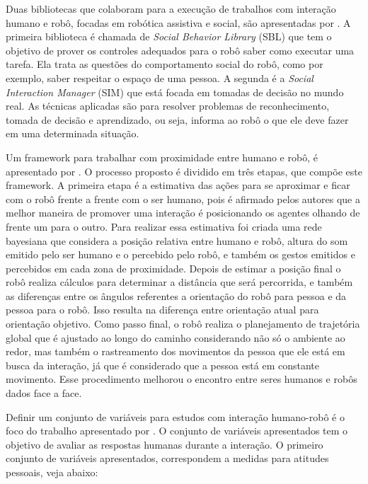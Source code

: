 Duas bibliotecas que colaboram para a execução de trabalhos com interação humano e robô, focadas em robótica assistiva e social, são apresentadas por . A primeira biblioteca é chamada de \emph{Social Behavior Library} (SBL) que tem o objetivo de prover os controles adequados para o robô saber como executar uma tarefa. Ela trata as questões do comportamento social do robô, como por exemplo, saber respeitar o espaço de uma pessoa. A segunda é a \emph{Social Interaction Manager} (SIM) que está focada em tomadas de decisão no mundo real. As técnicas aplicadas são para resolver problemas de reconhecimento, tomada de decisão e aprendizado, ou seja, informa ao robô o que ele deve fazer em uma determinada situação.

Um framework para trabalhar com proximidade entre humano e robô, é apresentado por . O processo proposto é dividido em três etapas, que compõe este framework. A primeira etapa é a estimativa das ações para se aproximar e ficar com o robô frente a frente com o ser humano, pois é afirmado pelos autores que a melhor maneira de promover uma interação é posicionando os agentes olhando de frente um para o outro. Para realizar essa estimativa foi criada uma rede bayesiana que considera a posição relativa entre humano e robô, altura do som emitido pelo ser humano e o percebido pelo robô, e também os gestos emitidos e percebidos em cada zona de proximidade. Depois de estimar a posição final o robô realiza cálculos para determinar a distância que será percorrida, e também as diferenças entre os ângulos referentes a orientação do robô para pessoa e da pessoa para o robô. Isso resulta na diferença entre orientação atual para orientação objetivo. Como passo final, o robô realiza o planejamento de trajetória global que é ajustado ao longo do caminho considerando não só o ambiente ao redor, mas também o rastreamento dos movimentos da pessoa que ele está em busca da interação, já que é considerado que a pessoa está em constante movimento. Esse procedimento melhorou o encontro entre seres humanos e robôs dados face a face.

Definir um conjunto de variáveis para estudos com interação humano-robô é o foco do trabalho apresentado por . O conjunto de variáveis apresentados tem o objetivo de avaliar as respostas humanas durante a interação. O primeiro conjunto de variáveis apresentados, correspondem a medidas para atitudes pessoais, veja abaixo:

